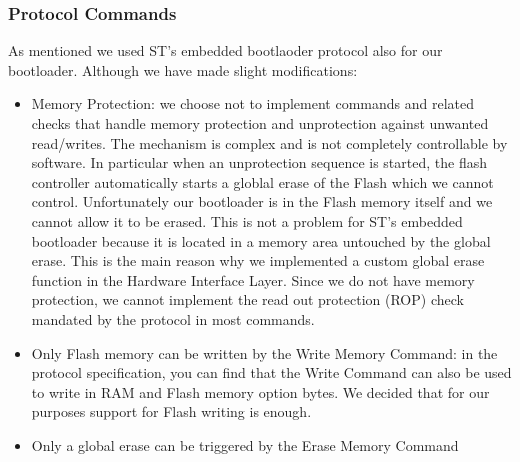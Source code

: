 \documentclass[11pt]{article} %
\begin{document}
\subsubsection{Protocol Commands}
As mentioned we used ST's embedded bootlaoder protocol also for our bootloader. Although we have made slight modifications:
\begin{itemize}
\item Memory Protection: we choose not to implement commands and related checks that handle memory protection and unprotection against unwanted read/writes. The mechanism is complex and is not completely controllable by software. In particular when an unprotection sequence is started, the flash controller automatically starts a globlal erase of the Flash which we cannot control. Unfortunately our bootloader is in the Flash memory itself and we cannot allow it to be erased. This is not a problem for ST's embedded bootloader because it is located in a memory area untouched by the global erase. This is the main reason why we implemented a custom global erase function in the Hardware Interface Layer. Since we do not have memory protection, we cannot implement the read out protection (ROP) check mandated by the protocol in most commands.
\item Only Flash memory can be written by the Write Memory Command: in the protocol specification, you can find that the Write Command can also be used to write in RAM and Flash memory option bytes. We decided that for our purposes support for Flash writing is enough.
\item Only a global erase can be triggered by the Erase Memory Command
\end{itemize}
\end{document}

